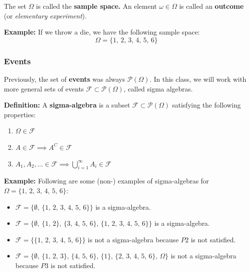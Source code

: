 \documentclass[a4paper]{extarticle}
\begin{document}
The set \(\Omega\) is called the \textbf{sample space.} An element \(\omega \in \Omega\) is called an \textbf{outcome} (or \textit{elementary experiment}).

\begin{ebox}
    \textbf{Example:} If we throw a die, we have the following sample space:
    \[
        \Omega = \{1, \, 2, \, 3, \, 4, \, 5, \, 6\}  
    \]
\end{ebox}

\subsubsection{Events}

Previously, the set of \textbf{events} was always \(\mathcal{P}(\Omega)\). In this class, we will work with more general sets of events \(\mathcal{F} \subset \mathcal{P}(\Omega)\), called sigma algebras.

\textbf{Definition:} A \textbf{sigma-algebra} is a subset \(\mathcal{F} \subset \mathcal{P}(\Omega)\) satisfying the following properties:

\begin{enumerate}
    \item \(\Omega \in \mathcal{F}\)
    \item \(A \in \mathcal{F} \implies A^C \in \mathcal{F}\)
    \item \(A_1, A_2,... \in \mathcal{F} \implies \bigcup_{i = 1}^{\infty} A_i \in \mathcal{F}\)
\end{enumerate}

\begin{ebox}
    \textbf{Example:} Following are some (non-) examples of sigma-algebras for \(\Omega = \{1, \, 2, \, 3, \, 4, \, 5, \, 6\}\):

    \begin{itemize}
        \item \(\mathcal{F} = \{\emptyset, \, \{1, \, 2, \, 3, \, 4, \, 5, \, 6\}\}\) is a sigma-algebra.
        \item \(\mathcal{F} = \{\emptyset, \, \{1, \, 2\}, \, \{3, \, 4, \, 5, \, 6\}, \, \{1, \, 2, \, 3, \, 4, \, 5, \, 6\}\}\) is a sigma-algebra.
        \item \(\mathcal{F} = \{\{1, \, 2, \, 3, \, 4, \, 5, \, 6\}\}\) is not a sigma-algebra because \(P2\) is not satisfied.
        \item \(\mathcal{F} = \{\emptyset, \, \{1, \, 2, \, 3\}, \, \{4, \, 5, \, 6\}, \, \{1\}, \, \{2, \, 3, \, 4, \, 5, \, 6\}, \, \Omega\}\) is not a sigma-algebra because \(P3\) is not satisfied.
    \end{itemize}
\end{ebox}
\end{document}

